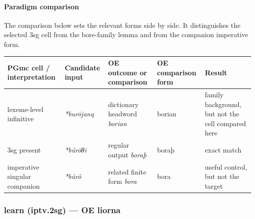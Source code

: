 \documentclass[
  british,
  a4paper,
]{article}
\newcounter{none} %
\begin{document}
\paragraph{Paradigm comparison}\label{paradigm-comparison-21}

The comparison below sets the relevant forms side by side. It
distinguishes the selected 3sg cell from the bore-family lemma and from
the companion imperative form.

{\def\LTcaptype{none} %
\begin{longtable}[]{@{}
  >{\raggedright\arraybackslash}p{}
  >{\raggedright\arraybackslash}p{}
  >{\raggedright\arraybackslash}p{}
  >{\raggedright\arraybackslash}p{}
  >{\raggedright\arraybackslash}p{}@{}}
\toprule\noalign{}
\begin{minipage}[b]{\linewidth}\raggedright
PGmc cell / interpretation
\end{minipage} & \begin{minipage}[b]{\linewidth}\raggedright
Candidate input
\end{minipage} & \begin{minipage}[b]{\linewidth}\raggedright
OE outcome or comparison
\end{minipage} & \begin{minipage}[b]{\linewidth}\raggedright
OE comparison form
\end{minipage} & \begin{minipage}[b]{\linewidth}\raggedright
Result
\end{minipage} \\
\midrule\noalign{}
\endhead
\bottomrule\noalign{}
\endlastfoot
lexeme-level infinitive & \emph{*burōjaną} & dictionary headword
\emph{borian} & borian & family background, but not the cell compared
here \\
3sg present & \emph{*búrōθi} & regular output \emph{boraþ} & boraþ &
exact match \\
imperative singular companion & \emph{*búrô} & related finite form
\emph{bora} & bora & useful control, but not the target \\
\end{longtable}
}

\subsubsection{learn (iptv.2sg) --- OE
liorna}\label{learn-iptv.2sg-oe-liorna}
\end{document}
